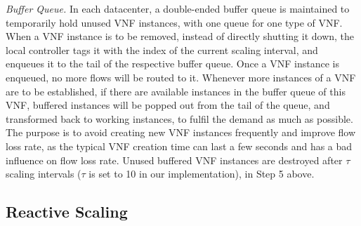 \textit{Buffer Queue.} In each datacenter, a double-ended buffer queue is maintained to temporarily hold unused VNF instances, with one queue for one type of VNF. When a VNF instance is to be removed, instead of directly shutting it down, the local controller tags it with the index of the current scaling interval, and enqueues it to the tail of the respective buffer queue. Once a VNF instance is enqueued, no more flows will be routed to it. Whenever more instances of a VNF are to be established, if there are available instances in the buffer queue of this VNF, buffered instances will be popped out from the tail of the queue, and transformed back to working instances, to fulfil the demand as much as possible. The purpose is to avoid creating new VNF instances frequently and improve flow loss rate, as the typical VNF creation time can last a few seconds and has a bad influence on flow loss rate. Unused buffered VNF instances are destroyed after $\tau$ scaling intervals ($\tau$ is set to 10 in our implementation), in Step 5 above.

\vspace{-3mm}
\subsection{Reactive Scaling}
\label{sec:CP_reactivescale}

